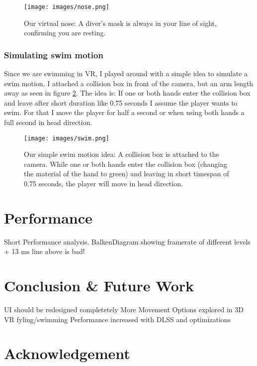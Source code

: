 \documentclass[letterpaper, 10 pt, conference]{ieeeconf}  %
\begin{document}
 \begin{figure}[!ht]
    \caption{Our virtual nose: A diver's mask is always in your line of sight, confirming you are resting.}
    \centering
    \texttt{[image: images/nose.png]}
    \label{fig:nose}
\end{figure}

\subsubsection{Simulating swim motion}

Since we are swimming in VR, I played around with a simple idea to simulate a swim motion.
I attached a collision box in front of the camera, but an arm length away as seen in figure \ref{fig:swim}.
The idea is: 
If one or both hands enter the collision box and leave after short duration like 0.75 seconds I assume the player wants to swim.
For that I move the player for half a second or when using both hands a full second in head direction.

\begin{figure}[!ht]
    \caption{Our simple swim motion idea: A collision box is attached to the camera.
    While one or both hands enter the collision box (changing the material of the hand to green) and leaving in short timespan of 0.75 seconds, the player will move in head direction.}
    \centering
    \texttt{[image: images/swim.png]}
    \label{fig:swim}
\end{figure}


\section{Performance}
\label{Sec:Performance}

Short Performance analysis.
BalkenDiagram showing framerate of different levels + 13 ms line above is bad!

\section{Conclusion \& Future Work}
\label{Sec:ConcFuture}

UI should be redesigned completetely
More Movement Options explored in 3D VR fyling/swimming
Performance increased with DLSS and optimizations

\section*{Acknowledgement}
\label{Sec:Acknowledgement}
\end{document}
